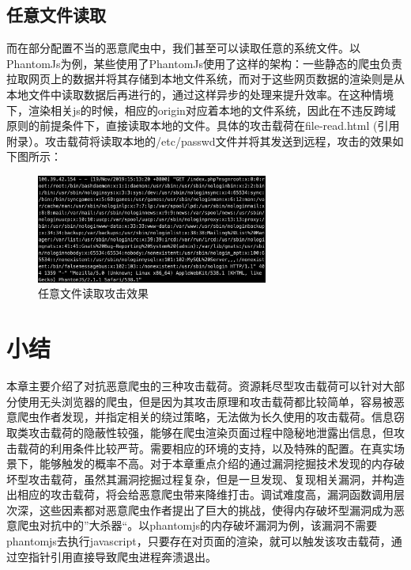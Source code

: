 \documentclass[doctor,privacy,twoside]{buaa_mac}
\begin{document}
\subsection{任意文件读取}
而在部分配置不当的恶意爬虫中，我们甚至可以读取任意的系统文件。以PhantomJs为例，某些使用了PhantomJs使用了这样的架构：一些静态的爬虫负责拉取网页上的数据并将其存储到本地文件系统，而对于这些网页数据的渲染则是从本地文件中读取数据后再进行的，通过这样异步的处理来提升效率。在这种情境下，渲染相关js的时候，相应的origin对应着本地的文件系统，因此在不违反跨域原则的前提条件下，直接读取本地的文件。具体的攻击载荷在file-read.html (引用附录）。攻击载荷将读取本地的/etc/passwd文件并将其发送到远程，攻击的效果如下图所示：

\centerline{}
\begin{figure}[!h]
  \centering
  \includegraphics[width=0.68\textwidth]{images/file_read.png}
  \caption{任意文件读取攻击效果}
  \label{fig:logo}
\end{figure}
\centerline{}

\section{小结}
本章主要介绍了对抗恶意爬虫的三种攻击载荷。资源耗尽型攻击载荷可以针对大部分使用无头浏览器的爬虫，但是因为其攻击原理和攻击载荷都比较简单，容易被恶意爬虫作者发现，并指定相关的绕过策略，无法做为长久使用的攻击载荷。信息窃取类攻击载荷的隐蔽性较强，能够在爬虫渲染页面过程中隐秘地泄露出信息，但攻击载荷的利用条件比较严苛。需要相应的环境的支持，以及特殊的配置。在真实场景下，能够触发的概率不高。对于本章重点介绍的通过漏洞挖掘技术发现的内存破坏型攻击载荷，虽然其漏洞挖掘过程复杂，但是一旦发现、复现相关漏洞，并构造出相应的攻击载荷，将会给恶意爬虫带来降维打击。调试难度高，漏洞函数调用层次深，这些因素都对恶意爬虫作者提出了巨大的挑战，使得内存破坏型漏洞成为恶意爬虫对抗中的”大杀器“。以phantomjs的内存破坏漏洞为例，该漏洞不需要phantomjs去执行javascript，只要存在对页面的渲染，就可以触发该攻击载荷，通过空指针引用直接导致爬虫进程奔溃退出。
\end{document}
